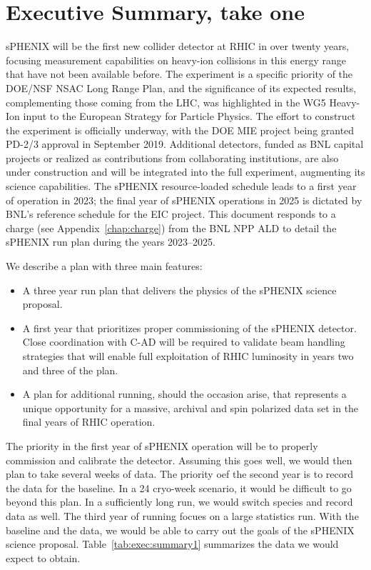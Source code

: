 \chapter*{Executive Summary, take one}
\label{executive_summary}
\setcounter{page}{1}

sPHENIX will be the first new collider detector at RHIC in over twenty years,
focusing measurement capabilities on heavy-ion collisions in this energy range
that have not been available before.  The experiment is a specific priority of
the DOE/NSF NSAC Long Range Plan, and the significance of its expected results,
complementing those coming from the LHC, was highlighted in the WG5 Heavy-Ion
input to the European Strategy for Particle Physics.  The effort to construct
the experiment is officially underway, with the DOE MIE project being granted
PD-2/3 approval in September 2019.  Additional detectors, funded as BNL capital
projects or realized as contributions from collaborating institutions, are also
under construction and will be integrated into the full experiment, augmenting
its science capabilities.  The sPHENIX resource-loaded schedule leads to a first
year of operation in 2023; the final year of sPHENIX operations in 2025 is
dictated by BNL's reference schedule for the EIC project.  This document
responds to a charge (see Appendix~\ref{chap:charge}) from the BNL NPP ALD to
detail the sPHENIX run plan during the years 2023--2025.

We describe a plan with three main features:
\begin{itemize}
\item A three year run plan that delivers the physics of the sPHENIX science proposal.
\item A first year that prioritizes proper commissioning of the
  sPHENIX detector.  Close coordination with C-AD will be required to
  validate beam handling strategies that will enable full exploitation
  of RHIC luminosity in years two and three of the plan.
\item A plan for additional running, should the occasion arise, that
  represents a unique opportunity for a massive, archival \auau and
  spin polarized \pp data set in the final years of RHIC operation.
\end{itemize}

The priority in the first year of sPHENIX operation will be to
properly commission and calibrate the detector.  Assuming this goes
well, we would then plan to take several weeks of \auau data.  The
priority oef the second year is to record the data for the \pp
baseline.  In a 24 cryo-week scenario, it would be difficult to go
beyond this plan.  In a sufficiently long run, we would switch species
and record \pAu data as well.  The third year of running focues on a
large statistics \auau run.  With the \pp baseline and the \auau data,
we would be able to carry out the goals of the sPHENIX science
proposal.  Table~\ref{tab:exec:summary1} summarizes the data we would
expect to obtain. 

